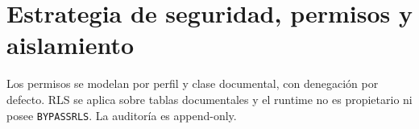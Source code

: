 \section{Estrategia de seguridad, permisos y aislamiento}
Los permisos se modelan por perfil y clase documental, con denegación por defecto. RLS se aplica sobre tablas documentales y el runtime no es propietario ni posee \texttt{BYPASSRLS}. La auditoría es append-only.
